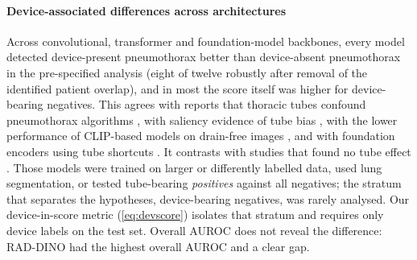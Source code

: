 \documentclass{ieeeaccess}
\begin{document}
\paragraph{Device-associated differences across architectures}
Across convolutional, transformer and foundation-model backbones, every model detected device-present pneumothorax better than device-absent pneumothorax in the pre-specified analysis (eight of twelve robustly after removal of the identified patient overlap), and in most the score itself was higher for device-bearing negatives. This agrees with reports that thoracic tubes confound pneumothorax algorithms \cite{rueckel2020tubes,rueckel2021annotations}, with saliency evidence of tube bias \cite{wollek2023attention}, with the lower performance of CLIP-based models on drain-free images \cite{sourget2025clip}, and with foundation encoders using tube shortcuts \cite{li2025featurequality}. It contrasts with studies that found no tube effect \cite{thian2021external,seah2021hidden,graf2020tube}. Those models were trained on larger or differently labelled data, used lung segmentation, or tested tube-bearing \emph{positives} against all negatives; the stratum that separates the hypotheses, device-bearing negatives, was rarely analysed. Our device-in-score metric (\cref{eq:devscore}) isolates that stratum and requires only device labels on the test set. Overall AUROC does not reveal the difference: RAD-DINO had the highest overall AUROC and a clear gap.
\end{document}
